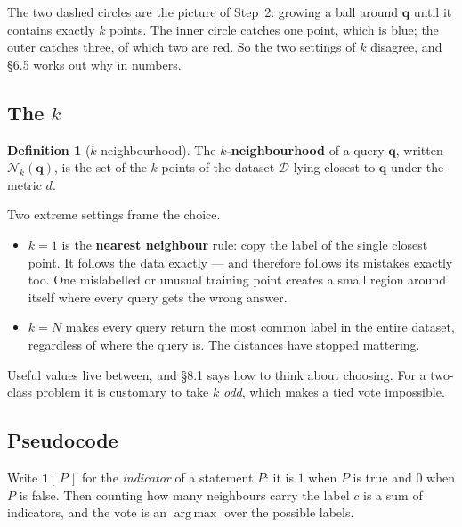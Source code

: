 \documentclass[11pt]{article}
\theoremstyle{plain}
\theoremstyle{definition}
\newtheorem{defn}{Definition}[section]
\theoremstyle{remark}
\newcommand{\vc}[1]{\mathbf{#1}}
\newcommand{\D}{\mathcal{D}}
\newcommand{\Nk}{\mathcal{N}_k}
\DeclareMathOperator*{\argmax}{arg\,max}
\begin{document}
\noindent The two dashed circles are the picture of Step~2: growing a ball
around $\vc{q}$ until it contains exactly $k$ points. The inner circle catches
one point, which is blue; the outer catches three, of which two are red. So the
two settings of $k$ disagree, and \S6.5 works out why in numbers.

\subsection{The $k$}
\begin{defn}[$k$-neighbourhood]
The \textbf{$k$-neighbourhood} of a query $\vc{q}$, written $\Nk(\vc{q})$, is
the set of the $k$ points of the dataset $\D$ lying closest to $\vc{q}$ under
the metric $d$.
\end{defn}

\noindent Two extreme settings frame the choice.

\begin{itemize}[leftmargin=1.4em,itemsep=4pt]
  \item $k=1$ is the \textbf{nearest neighbour} rule: copy the label of the
        single closest point. It follows the data exactly --- and therefore
        follows its mistakes exactly too. One mislabelled or unusual training
        point creates a small region around itself where every query gets the
        wrong answer.
  \item $k=N$ makes every query return the most common label in the entire
        dataset, regardless of where the query is. The distances have stopped
        mattering.
\end{itemize}

\noindent Useful values live between, and \S8.1 says how to think about
choosing. For a two-class problem it is customary to take $k$ \emph{odd}, which
makes a tied vote impossible.

\subsection{Pseudocode}
Write $\mathbf{1}[\,P\,]$ for the \emph{indicator} of a statement $P$: it is $1$
when $P$ is true and $0$ when $P$ is false. Then counting how many neighbours
carry the label $c$ is a sum of indicators, and the vote is an $\argmax$ over
the possible labels.
\end{document}

